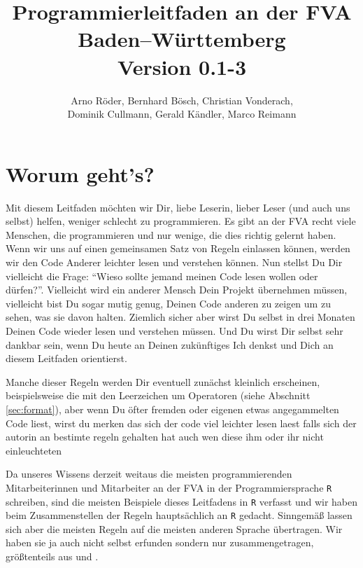 \documentclass[twoside]{scrartcl}
\providecommand{\R}{\texttt{R}}
\begin{document}


\title{Programmierleitfaden an der FVA Baden--W\"u{}rttemberg\\
\vspace{1cm}
\small{Version 0.1-3}}
\author{Arno R\"oder, Bernhard B\"o{}sch, Christian Vonderach,\\Dominik Cullmann,
Gerald K\"a{}ndler, Marco Reimann}
\maketitle
\tableofcontents
\thispagestyle{fancy}
\section{Worum geht's?}
Mit diesem Leitfaden m\"o{}chten wir Dir, liebe Leserin, lieber Leser (und auch
uns selbst) helfen, weniger schlecht zu programmieren.
Es gibt an der FVA recht viele Menschen, die programmieren und nur wenige, die
dies richtig gelernt haben. Wenn wir uns auf einen gemeinsamen Satz von Regeln
einlassen k\"o{}nnen, werden wir den Code Anderer leichter lesen und verstehen
k\"o{}nnen.
Nun stellst Du Dir vielleicht die Frage: "`Wieso sollte jemand meinen Code lesen
wollen oder d\"u{}rfen?"'. Vielleicht wird ein anderer Mensch Dein Projekt
\"u{}bernehmen m\"u{}ssen, vielleicht bist Du sogar mutig genug, Deinen Code
anderen zu zeigen um zu sehen, was sie davon halten. Ziemlich sicher aber wirst
Du selbst in drei Monaten Deinen Code wieder lesen und verstehen m\"u{}ssen. Und
Du wirst Dir selbst sehr dankbar sein, wenn Du heute an Deinen zuk\"u{}nftiges
Ich denkst und Dich an diesem Leitfaden orientierst.

Manche dieser Regeln werden Dir eventuell zun\"a{}chst kleinlich erscheinen,
beispielsweise die mit den Leerzeichen  um  Operatoren (siehe Abschnitt
\ref{sec:format}), aber wenn Du \"o{}fter fremden oder eigenen etwas
angegammelten Code liest, wirst
du merken das sich der code viel leichter lesen laest falls sich der autorin  an
bestimte regeln gehalten hat auch wen diese ihm oder ihr nicht einleuchteten

Da unseres Wissens derzeit weitaus die meisten programmierenden Mitarbeiterinnen
und Mitarbeiter an der FVA in der Programmiersprache \R{} schreiben, sind die
meisten Beispiele dieses Leitfadens in \R{} verfasst und wir haben beim
Zusammenstellen der Regeln haupts\"a{}chlich an \R{} gedacht.
Sinngem\"a{}\ss{} lassen sich aber die meisten Regeln auf die meisten
anderen Sprache \"u{}bertragen. Wir haben sie ja auch nicht selbst erfunden
sondern nur zusammengetragen, gr\"o{}\ss{}tenteils aus \cite{cc} und \cite{wsp}.
\end{document}
